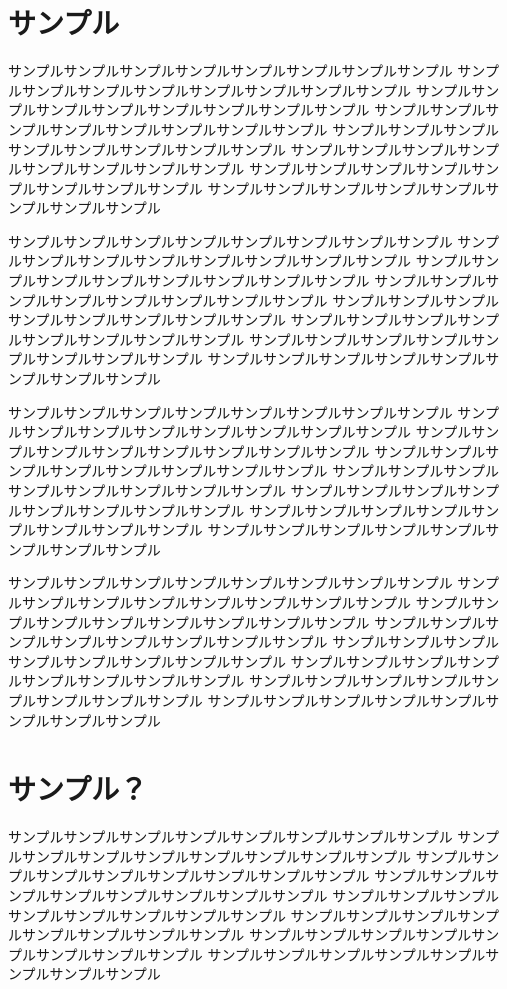 

\section{サンプル}
サンプルサンプルサンプルサンプルサンプルサンプルサンプルサンプル
サンプルサンプルサンプルサンプルサンプルサンプルサンプルサンプル
サンプルサンプルサンプルサンプルサンプルサンプルサンプルサンプル
サンプルサンプルサンプルサンプルサンプルサンプルサンプルサンプル
サンプルサンプルサンプルサンプルサンプルサンプルサンプルサンプル
サンプルサンプルサンプルサンプルサンプルサンプルサンプルサンプル
サンプルサンプルサンプルサンプルサンプルサンプルサンプルサンプル
サンプルサンプルサンプルサンプルサンプルサンプルサンプルサンプル


サンプルサンプルサンプルサンプルサンプルサンプルサンプルサンプル
サンプルサンプルサンプルサンプルサンプルサンプルサンプルサンプル
サンプルサンプルサンプルサンプルサンプルサンプルサンプルサンプル
サンプルサンプルサンプルサンプルサンプルサンプルサンプルサンプル
サンプルサンプルサンプルサンプルサンプルサンプルサンプルサンプル
サンプルサンプルサンプルサンプルサンプルサンプルサンプルサンプル
サンプルサンプルサンプルサンプルサンプルサンプルサンプルサンプル
サンプルサンプルサンプルサンプルサンプルサンプルサンプルサンプル


サンプルサンプルサンプルサンプルサンプルサンプルサンプルサンプル
サンプルサンプルサンプルサンプルサンプルサンプルサンプルサンプル
サンプルサンプルサンプルサンプルサンプルサンプルサンプルサンプル
サンプルサンプルサンプルサンプルサンプルサンプルサンプルサンプル
サンプルサンプルサンプルサンプルサンプルサンプルサンプルサンプル
サンプルサンプルサンプルサンプルサンプルサンプルサンプルサンプル
サンプルサンプルサンプルサンプルサンプルサンプルサンプルサンプル
サンプルサンプルサンプルサンプルサンプルサンプルサンプルサンプル


サンプルサンプルサンプルサンプルサンプルサンプルサンプルサンプル
サンプルサンプルサンプルサンプルサンプルサンプルサンプルサンプル
サンプルサンプルサンプルサンプルサンプルサンプルサンプルサンプル
サンプルサンプルサンプルサンプルサンプルサンプルサンプルサンプル
サンプルサンプルサンプルサンプルサンプルサンプルサンプルサンプル
サンプルサンプルサンプルサンプルサンプルサンプルサンプルサンプル
サンプルサンプルサンプルサンプルサンプルサンプルサンプルサンプル
サンプルサンプルサンプルサンプルサンプルサンプルサンプルサンプル

\section{サンプル？}
サンプルサンプルサンプルサンプルサンプルサンプルサンプルサンプル
サンプルサンプルサンプルサンプルサンプルサンプルサンプルサンプル
サンプルサンプルサンプルサンプルサンプルサンプルサンプルサンプル
サンプルサンプルサンプルサンプルサンプルサンプルサンプルサンプル
サンプルサンプルサンプルサンプルサンプルサンプルサンプルサンプル
サンプルサンプルサンプルサンプルサンプルサンプルサンプルサンプル
サンプルサンプルサンプルサンプルサンプルサンプルサンプルサンプル
サンプルサンプルサンプルサンプルサンプルサンプルサンプルサンプル


